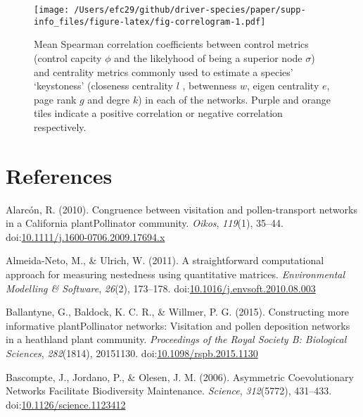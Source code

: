 \documentclass[a4paper]{artikel1}
\theoremstyle{definition}
\theoremstyle{definition}
\theoremstyle{definition}
\theoremstyle{remark}
\begin{document}
\begin{figure}
\centering
\texttt{[image: /Users/efc29/github/driver-species/paper/supp-info\_files/figure-latex/fig-correlogram-1.pdf]}
\caption{\label{fig:fig-correlogram}Mean Spearman correlation coefficients
between control metrics (control capcity \(\phi\) and the likelyhood of
being a superior node \(\sigma\)) and centrality metrics commonly used
to estimate a species' `keystoness' (closeness centrality \(l\) ,
betwenness \(w\), eigen centrality \(e\), page rank \(g\) and degre
\(k\)) in each of the networks. Purple and orange tiles indicate a
positive correlation or negative correlation respectively.}
\end{figure}

\clearpage 

\section*{References}\label{references}

\hypertarget{refs}{}
\hypertarget{ref-alarcon_congruence_2010}{}
Alarcón, R. (2010). Congruence between visitation and pollen-transport
networks in a California plantPollinator community. \emph{Oikos},
\emph{119}(1), 35--44.
doi:\href{https://doi.org/10.1111/j.1600-0706.2009.17694.x}{10.1111/j.1600-0706.2009.17694.x}

\hypertarget{ref-almeida-neto_straightforward_2011}{}
Almeida-Neto, M., \& Ulrich, W. (2011). A straightforward computational
approach for measuring nestedness using quantitative matrices.
\emph{Environmental Modelling \& Software}, \emph{26}(2), 173--178.
doi:\href{https://doi.org/10.1016/j.envsoft.2010.08.003}{10.1016/j.envsoft.2010.08.003}

\hypertarget{ref-ballantyne_constructing_2015}{}
Ballantyne, G., Baldock, K. C. R., \& Willmer, P. G. (2015).
Constructing more informative plantPollinator networks: Visitation and
pollen deposition networks in a heathland plant community.
\emph{Proceedings of the Royal Society B: Biological Sciences},
\emph{282}(1814), 20151130.
doi:\href{https://doi.org/10.1098/rspb.2015.1130}{10.1098/rspb.2015.1130}

\hypertarget{ref-bascompte_asymmetric_2006}{}
Bascompte, J., Jordano, P., \& Olesen, J. M. (2006). Asymmetric
Coevolutionary Networks Facilitate Biodiversity Maintenance.
\emph{Science}, \emph{312}(5772), 431--433.
doi:\href{https://doi.org/10.1126/science.1123412}{10.1126/science.1123412}
\end{document}
